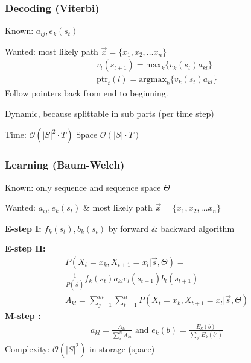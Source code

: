\documentclass[main]{subfiles}
\begin{document}
\begin{landscape}
\begin{multicols}{4}
{\color{subsubsectionColor}\subsubsection{Decoding (Viterbi)}}
Known: $a_{ij}, e_k(s_t)$

Wanted: most likely path $\vec{x} = \{x_1,x_2,\ldots x_n\}$
\begin{eqnarray}
v_l(s_{t+1}) = \text{max}_k \{ v_k(s_t) a_{kl} \} \\
\text{ptr}_t(l) = \text{argmax}_k \{ v_k(s_t) a_{kl} \}
\end{eqnarray}
Follow pointers back from end to beginning.

Dynamic, because splittable in sub parts (per time step)

Time: $\mathcal{O}(|S|^2 \cdot T)$
Space $\mathcal{O}(|S| \cdot T)$

{\color{subsubsectionColor}\subsubsection{Learning (Baum-Welch)}}
Known: only sequence and sequence space $\Theta$

Wanted: $a_{ij}, e_k(s_t)$ \& most likely path $\vec{x} = \{x_1,x_2,\ldots x_n\}$

\textbf{E-step I:} $f_k(s_t), b_k(s_t)$ by forward \& backward algorithm

\textbf{E-step II:}
\begin{eqnarray}
P(X_t = x_k, X_{t+1} = x_l | \vec{s}, \Theta) = \\
 \frac{1}{P(\vec{s})} f_k(s_t) a_{kl} e_l(s_{t+1}) b_l(s_{t+1}) \\
A_{kl} = \sum\limits_{j=1}^m \sum\limits_{t=1}^n P(X_t = x_k, X_{t+1} = x_l | \vec{s}, \Theta)
\end{eqnarray}
\textbf{M-step :}
\begin{eqnarray}
a_{kl} = \frac{A_{kl}}{\sum\limits_i^n A_{ki}} \text{   and   } e_k(b) = \frac{E_k(b)}{\sum_{b'} E_k(b')}
\end{eqnarray}
Complexity: $\mathcal{O}(|S|^2)$ in storage (space)
\end{multicols}
\end{landscape}
\end{document}
